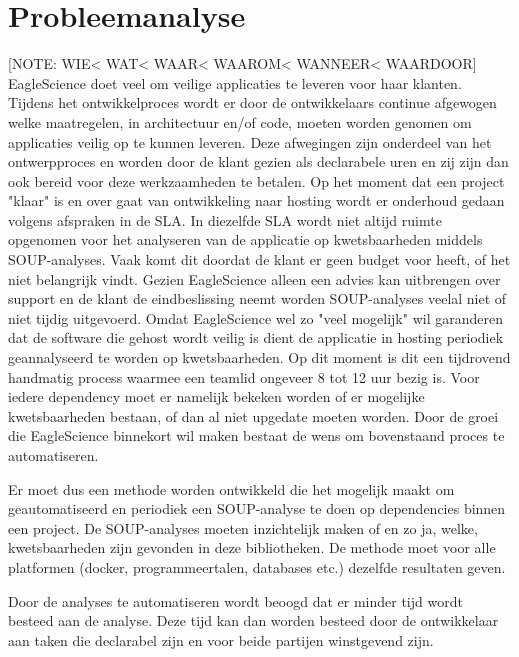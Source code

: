 \section{Probleemanalyse}\label{sec:probleemanalyse}
[NOTE: WIE< WAT< WAAR< WAAROM< WANNEER< WAARDOOR]
EagleScience doet veel om veilige applicaties te leveren voor haar klanten. Tijdens het ontwikkelproces wordt er door de ontwikkelaars continue afgewogen welke maatregelen, in architectuur en/of code, moeten worden genomen om applicaties veilig op te kunnen leveren. Deze afwegingen zijn onderdeel van het ontwerpproces en worden door de klant gezien als declarabele uren en zij zijn dan ook bereid voor deze werkzaamheden te betalen. Op het moment dat een project "klaar" is en over gaat van ontwikkeling naar hosting wordt er onderhoud gedaan volgens afspraken in de SLA. In diezelfde SLA wordt niet altijd ruimte opgenomen voor het analyseren van de applicatie op kwetsbaarheden middels SOUP-analyses. Vaak komt dit doordat de klant er geen budget voor heeft, of het niet belangrijk vindt. Gezien EagleScience alleen een advies kan uitbrengen over support en de klant de eindbeslissing neemt worden SOUP-analyses veelal niet of niet tijdig uitgevoerd. Omdat EagleScience wel zo "veel mogelijk" wil garanderen dat de software die gehost wordt veilig is dient de applicatie in hosting periodiek geannalyseerd te worden op kwetsbaarheden. Op dit moment is dit een tijdrovend handmatig process waarmee een teamlid ongeveer 8 tot 12 uur bezig is. Voor iedere dependency moet er namelijk bekeken worden of er mogelijke kwetsbaarheden bestaan, of dan al niet upgedate moeten worden. Door de groei die EagleScience binnekort wil maken bestaat de wens om bovenstaand proces te automatiseren.

Er moet dus een methode worden ontwikkeld die het mogelijk maakt om geautomatiseerd en periodiek een SOUP-analyse te doen op dependencies binnen een project. De SOUP-analyses moeten inzichtelijk maken of en zo ja, welke, kwetsbaarheden zijn gevonden in deze bibliotheken. De methode moet voor alle platformen (docker, programmeertalen, databases etc.) dezelfde resultaten geven.

Door de analyses te automatiseren wordt beoogd dat er minder tijd wordt besteed aan de analyse. Deze tijd kan dan worden besteed door de ontwikkelaar aan taken die declarabel zijn en voor beide partijen winstgevend zijn.

